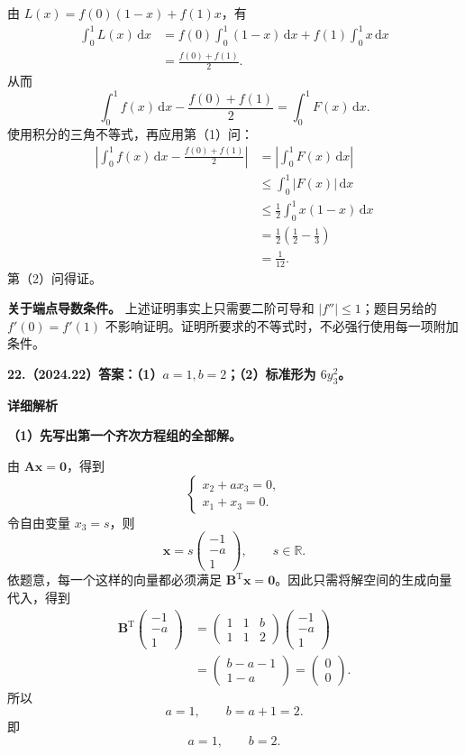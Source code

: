 \documentclass[UTF8,11pt,fontset=windows]{ctexart}
\begin{document}
由 $L(x)=f(0)(1-x)+f(1)x$，有
$$
\begin{aligned}
\int_0^1L(x)\,\mathrm dx
&=f(0)\int_0^1(1-x)\,\mathrm dx
+f(1)\int_0^1x\,\mathrm dx\\
&=\frac{f(0)+f(1)}2.
\end{aligned}
$$
从而
$$
\int_0^1f(x)\,\mathrm dx-\frac{f(0)+f(1)}2
=\int_0^1F(x)\,\mathrm dx.
$$
使用积分的三角不等式，再应用第（1）问：
$$
\begin{aligned}
\left|\int_0^1f(x)\,\mathrm dx-\frac{f(0)+f(1)}2\right|
&=\left|\int_0^1F(x)\,\mathrm dx\right|\\
&\le\int_0^1|F(x)|\,\mathrm dx\\
&\le\frac12\int_0^1x(1-x)\,\mathrm dx\\
&=\frac12\left(\frac12-\frac13\right)\\
&=\frac1{12}.
\end{aligned}
$$
第（2）问得证。

\textbf{关于端点导数条件。} 上述证明事实上只需要二阶可导和 $|f''|\le1$；题目另给的 $f'(0)=f'(1)$ 不影响证明。证明所要求的不等式时，不必强行使用每一项附加条件。

\clearpage

\textbf{22.（2024.22）答案：（1）$a=1,b=2$；（2）标准形为 $6y_3^2$。}

\textbf{详细解析}

\textbf{（1）先写出第一个齐次方程组的全部解。}

由 $\boldsymbol A\boldsymbol x=\boldsymbol0$，得到
$$
\begin{cases}
x_2+ax_3=0,\\
x_1+x_3=0.
\end{cases}
$$
令自由变量 $x_3=s$，则
$$
\boldsymbol x=s\begin{pmatrix}-1\\-a\\1\end{pmatrix},
\qquad s\in\mathbb R.
$$
依题意，每一个这样的向量都必须满足 $\boldsymbol B^{\mathrm T}\boldsymbol x=\boldsymbol0$。因此只需将解空间的生成向量代入，得到
$$
\begin{aligned}
\boldsymbol B^{\mathrm T}
\begin{pmatrix}-1\\-a\\1\end{pmatrix}
&=\begin{pmatrix}1&1&b\\1&1&2\end{pmatrix}
\begin{pmatrix}-1\\-a\\1\end{pmatrix}\\[3pt]
&=\begin{pmatrix}b-a-1\\1-a\end{pmatrix}
=\begin{pmatrix}0\\0\end{pmatrix}.
\end{aligned}
$$
所以
$$
a=1,\qquad b=a+1=2.
$$
即
$$
\boxed{a=1,\qquad b=2}.
$$
\end{document}
